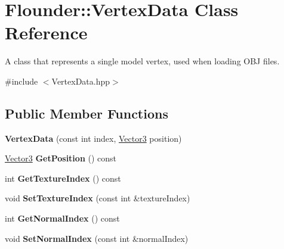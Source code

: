 \hypertarget{class_flounder_1_1_vertex_data}{}\section{Flounder\+:\+:Vertex\+Data Class Reference}
\label{class_flounder_1_1_vertex_data}


A class that represents a single model vertex, used when loading O\+BJ files.  




{\ttfamily \#include $<$Vertex\+Data.\+hpp$>$}

\subsection*{Public Member Functions}
\begin{DoxyCompactItemize}
\item 
\mbox{\label{class_flounder_1_1_vertex_data_a287c18a6239b1de3a7e73e0d38ea8291}} 
{\bfseries Vertex\+Data} (const int index, \hyperlink{class_flounder_1_1_vector3}{Vector3} position)
\item 
\mbox{\label{class_flounder_1_1_vertex_data_a4f2e589f7deb09852d426d10cd656116}} 
\hyperlink{class_flounder_1_1_vector3}{Vector3} {\bfseries Get\+Position} () const
\item 
\mbox{\label{class_flounder_1_1_vertex_data_ac0d9910f540f79456ad0eef4ac3b974d}} 
int {\bfseries Get\+Texture\+Index} () const
\item 
\mbox{\label{class_flounder_1_1_vertex_data_a585b1c51c38a125b63a847c0019c03e1}} 
void {\bfseries Set\+Texture\+Index} (const int \&texture\+Index)
\item 
\mbox{\label{class_flounder_1_1_vertex_data_af5004dbf2f8a9c93cac98da8867918d1}} 
int {\bfseries Get\+Normal\+Index} () const
\item 
\mbox{\label{class_flounder_1_1_vertex_data_acc195bf4ea4def3f6a3a3b88a16e75de}} 
void {\bfseries Set\+Normal\+Index} (const int \&normal\+Index)
\item 

\end{DoxyCompactItemize}

